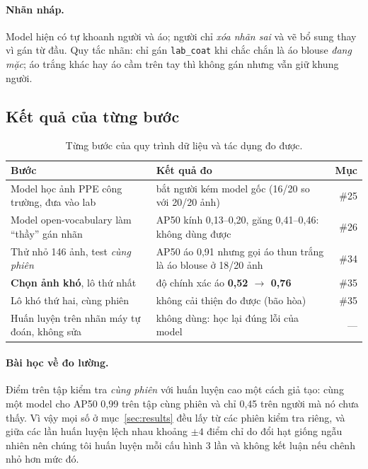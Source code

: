 \documentclass[12pt,a4paper]{article}
\begin{document}
\paragraph{Nhãn nháp.} Model hiện có tự khoanh người và áo; người chỉ \emph{xóa nhãn sai} và vẽ bổ sung thay vì gán từ
đầu. Quy tắc nhãn: chỉ gán \texttt{lab\_coat} khi chắc chắn là áo blouse \emph{đang mặc}; áo trắng khác hay áo cầm trên
tay thì không gán nhưng vẫn giữ khung người.

\subsection{Kết quả của từng bước}

\begin{table}[ht]
\centering
\caption{Từng bước của quy trình dữ liệu và tác dụng đo được.}
\label{tab:data}
\begin{tabularx}{\textwidth}{>{\raggedright\arraybackslash}X >{\raggedright\arraybackslash}X r}
\toprule
Bước & Kết quả đo & Mục \\
\midrule
Model học ảnh PPE công trường, đưa vào lab & bắt người kém model gốc (16/20 so với 20/20 ảnh) & \#25 \\
Model open-vocabulary làm ``thầy'' gán nhãn & AP50 kính 0,13--0,20, găng 0,41--0,46: không dùng được & \#26 \\
Thử nhỏ 146 ảnh, test \emph{cùng phiên} & AP50 áo 0,91 nhưng gọi áo thun trắng là áo blouse ở 18/20 ảnh & \#34 \\
\textbf{Chọn ảnh khó}, lô thứ nhất & độ chính xác áo \textbf{0,52 $\to$ 0,76} & \#35 \\
Lô khó thứ hai, cùng phiên & không cải thiện đo được (bão hòa) & \#35 \\
Huấn luyện trên nhãn máy tự đoán, không sửa & không dùng: học lại đúng lỗi của model & --- \\
\bottomrule
\end{tabularx}
\end{table}

\paragraph{Bài học về đo lường.} Điểm trên tập kiểm tra \emph{cùng phiên} với huấn luyện cao một cách giả tạo: cùng một model
cho AP50 0,99 trên tập cùng phiên và chỉ 0,45 trên người mà nó chưa thấy. Vì vậy mọi số ở mục~\ref{sec:results} đều lấy
từ các phiên kiểm tra riêng, và giữa các lần huấn luyện lệch nhau khoảng $\pm4$ điểm chỉ do đổi hạt giống ngẫu nhiên
nên chúng tôi huấn luyện mỗi cấu hình 3 lần và không kết luận nếu chênh nhỏ hơn mức đó.
\end{document}
